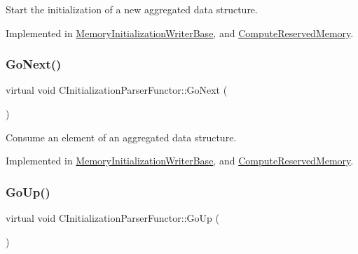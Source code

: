 Start the initialization of a new aggregated data structure. 



Implemented in \hyperlink{classMemoryInitializationWriterBase_a3ad046983ce9cfe765bcccb7ea16f47f}{Memory\+Initialization\+Writer\+Base}, and \hyperlink{classComputeReservedMemory_aad5d8055485eb76d21ee52ce5a4d18c7}{Compute\+Reserved\+Memory}.

\mbox{\label{classCInitializationParserFunctor_a4f9a305b8ecfba8a372583123b2878ed}} 
\subsubsection{\texorpdfstring{Go\+Next()}{GoNext()}}
{\footnotesize\ttfamily virtual void C\+Initialization\+Parser\+Functor\+::\+Go\+Next (\begin{DoxyParamCaption}{ }\end{DoxyParamCaption})\hspace{0.3cm}{\ttfamily [pure virtual]}}



Consume an element of an aggregated data structure. 



Implemented in \hyperlink{classMemoryInitializationWriterBase_a6b67daf4f3e0a2ff88bc824c80f11ea6}{Memory\+Initialization\+Writer\+Base}, and \hyperlink{classComputeReservedMemory_a091e52fa0cbf1db832a824c11c7c75d2}{Compute\+Reserved\+Memory}.

\mbox{\label{classCInitializationParserFunctor_ac502a0c076635becd22e65f2281c5c46}} 
\subsubsection{\texorpdfstring{Go\+Up()}{GoUp()}}
{\footnotesize\ttfamily virtual void C\+Initialization\+Parser\+Functor\+::\+Go\+Up (\begin{DoxyParamCaption}{ }\end{DoxyParamCaption})\hspace{0.3cm}{\ttfamily [pure virtual]}}



